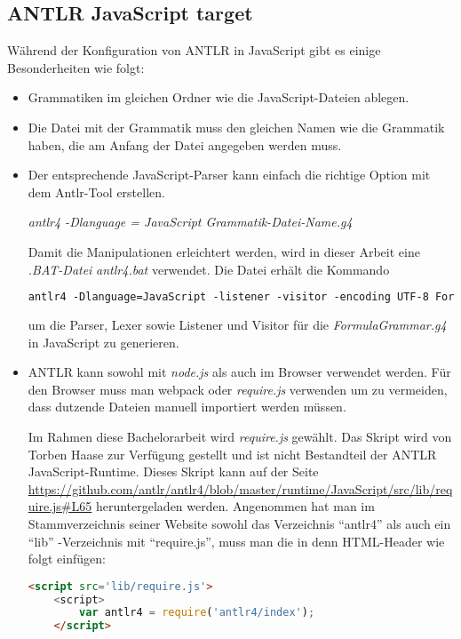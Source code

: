 \subsection{ANTLR JavaScript target}
Während der Konfiguration von ANTLR in JavaScript gibt es einige Besonderheiten wie folgt:

\begin{itemize}
\item 	Grammatiken im gleichen Ordner wie die JavaScript-Dateien ablegen.
\item	Die Datei mit der Grammatik muss den gleichen Namen wie die Grammatik haben, die am Anfang der Datei angegeben werden muss.
\item	Der entsprechende JavaScript-Parser kann einfach die richtige Option mit dem Antlr-Tool erstellen.

\textit{antlr4 -Dlanguage = JavaScript Grammatik-Datei-Name.g4}

Damit die Manipulationen erleichtert werden, wird in dieser Arbeit eine \textit{.BAT-Datei} \textit{antlr4.bat} verwendet. Die Datei erhält die Kommando
\begin{lstlisting}[language=HTML,basicstyle=\scriptsize]
	antlr4 -Dlanguage=JavaScript -listener -visitor -encoding UTF-8 FormulaGrammar.g4
\end{lstlisting}
um die Parser, Lexer sowie Listener und Visitor für die \textit{FormulaGrammar.g4} in JavaScript zu generieren.

\item	ANTLR kann sowohl mit \textit{node.js} als auch im Browser verwendet werden. Für den Browser muss man webpack oder \textit{require.js} verwenden um zu vermeiden, dass dutzende Dateien manuell importiert werden müssen.

Im Rahmen diese Bachelorarbeit wird \textit{require.js} gewählt. Das Skript wird von Torben Haase zur Verfügung gestellt und ist nicht Bestandteil der ANTLR JavaScript-Runtime. Dieses Skript kann auf der Seite \url{https://github.com/antlr/antlr4/blob/master/runtime/JavaScript/src/lib/require.js\#L65} heruntergeladen werden.
Angenommen hat man im Stammverzeichnis seiner Website sowohl das Verzeichnis ``antlr4'' als auch ein ``lib'' -Verzeichnis mit ``require.js'', muss man die in denn HTML-Header wie folgt einfügen:

\begin{lstlisting}[language=HTML,basicstyle=\scriptsize]
	<script src='lib/require.js'>
	<script>
		var antlr4 = require('antlr4/index');
	</script>
\end{lstlisting}


\end{itemize}
